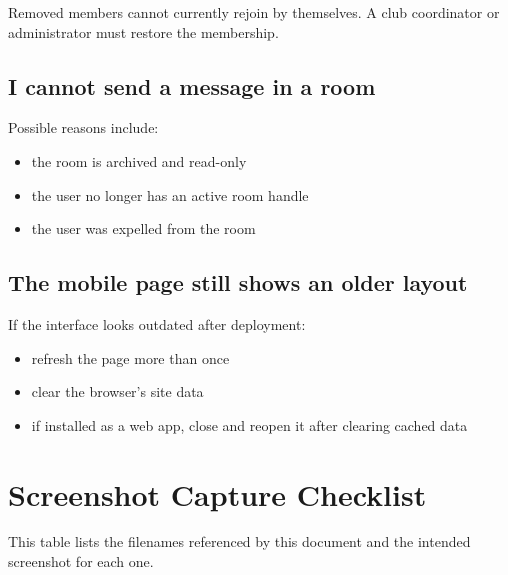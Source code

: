 \documentclass[11pt,a4paper]{article}
\begin{document}
Removed members cannot currently rejoin by themselves. A club coordinator or administrator must restore the membership.

\subsection{I cannot send a message in a room}

Possible reasons include:

\begin{itemize}[leftmargin=1.5em]
  \item the room is archived and read-only
  \item the user no longer has an active room handle
  \item the user was expelled from the room
\end{itemize}

\subsection{The mobile page still shows an older layout}

If the interface looks outdated after deployment:

\begin{itemize}[leftmargin=1.5em]
  \item refresh the page more than once
  \item clear the browser's site data
  \item if installed as a web app, close and reopen it after clearing cached data
\end{itemize}

\section{Screenshot Capture Checklist}

This table lists the filenames referenced by this document and the intended screenshot for each one.
\end{document}
